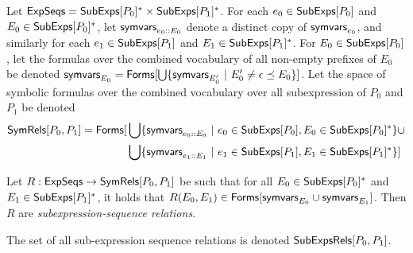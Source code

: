 Let $\mathsf{ExpSeqs} = \mathsf{SubExps}[ P_0 ]^{*} \times \mathsf{SubExps}[ P_1 ]^{*}$.
%
For each $e_0 \in \mathsf{SubExps}[ P_0 ]$ and $E_0 \in \mathsf{SubExps}[ P_0 ]^{*}$, let
$\mathsf{symvars}_{e_0 \mathbin{::} E_0}$ denote a distinct copy of $\mathsf{symvars}_{e_0}$,
and similarly for each $e_1 \in \mathsf{SubExps}[ P_1 ]$ and $E_1 \in
\mathsf{SubExps}[ P_1 ]^{*}$.
%
For $E_0 \in \mathsf{SubExps}[  P_0  ]$, let the formulas over the combined
vocabulary of all non-empty prefixes of $E_0$ be denoted
$\symvars{E_0} = \formulas{ %
  \bigunion \setformer{ \symvars{E_0'} }{ E_0' \not= \epsilon \preceq
    E_0 } }$.
%
Let the space of symbolic formulas over the combined vocabulary over
all subexpression of $P_0$ and $P_1$ be denoted 
\begin{align*}
  \symrels{P_0}{P_1} =
  \formulas{ %
    & \bigunion \setformer{ \symvars{ e_0 \cons E_0 } }{ %
      e_0 \in \subexps{P_0}, E_0 \in \subexps{P_0}^{*} } \union \\ %
    & \bigunion \setformer{ \symvars{e_1 \cons E_1 } }{ %
      e_1 \in \subexps{P_1}, E_1 \in \subexps{P_1}^{*} } }  
\end{align*}
%
\begin{defn}
  \label{defn:sym-rels}
  Let $R: \mathsf{ExpSeqs} \to \mathsf{SymRels}[  P_0 ,  P_1  ]$ be such that %
  for all $E_0 \in \mathsf{SubExps}[ P_0 ]^{*}$ and $E_1 \in \mathsf{SubExps}[ P_1 ]^{*}$,
  it holds that %
  $R(E_0, E_1) \in \mathsf{Forms}[  \mathsf{symvars}_{E_0} \cup \mathsf{symvars}_{ E_1 }  ]$.
  Then $R$ are \emph{subexpression-sequence relations}.
\end{defn}
%
The set of all sub-expression sequence relations is denoted
$\mathsf{SubExpsRels}[ P_0, P_1 ]$.

